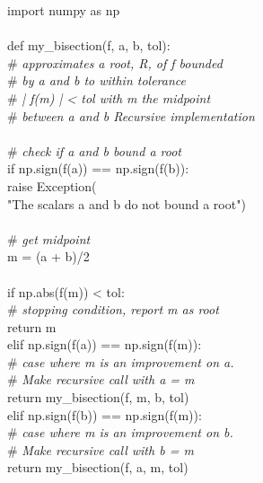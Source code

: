 \begin{mysolution}
\begin{boxB}
import numpy as np\\
\\
def my\_bisection(f, a, b, tol): \\
\hspace*{1cm}\# {\it approximates a root, R, of f bounded }\\
\hspace*{1cm}\# {\it by a and b to within tolerance }\\
\hspace*{1cm}\# {\it | f(m) | < tol with m the midpoint }\\
\hspace*{1cm}\# {\it between a and b Recursive implementation}\\
    \\
\hspace*{1cm}\# {\it check if a and b bound a root}\\
\hspace*{1cm}if np.sign(f(a)) == np.sign(f(b)):\\
\hspace*{1.5cm}raise Exception(\\
\hspace*{1.7cm}"The scalars a and b do not bound a root")\\
\\        
\hspace*{1cm}\# {\it get midpoint}\\
\hspace*{1cm}m = (a + b)/2\\
\\    
\hspace*{1cm}if np.abs(f(m)) < tol:\\
\hspace*{1.5cm}\# {\it stopping condition, report m as root}\\
\hspace*{1.5cm}return m\\
\hspace*{1cm}elif np.sign(f(a)) == np.sign(f(m)):\\
\hspace*{1.5cm}\# {\it case where m is an improvement on a. }\\
\hspace*{1.5cm}\# {\it Make recursive call with a = m}\\
\hspace*{1.5cm}return my\_bisection(f, m, b, tol)\\
\hspace*{1cm}elif np.sign(f(b)) == np.sign(f(m)):\\
\hspace*{1.5cm}\# {\it case where m is an improvement on b. }\\
\hspace*{1.5cm}\# {\it Make recursive call with b = m}\\
\hspace*{1.5cm}return my\_bisection(f, a, m, tol)
\end{boxB}
\end{mysolution}

